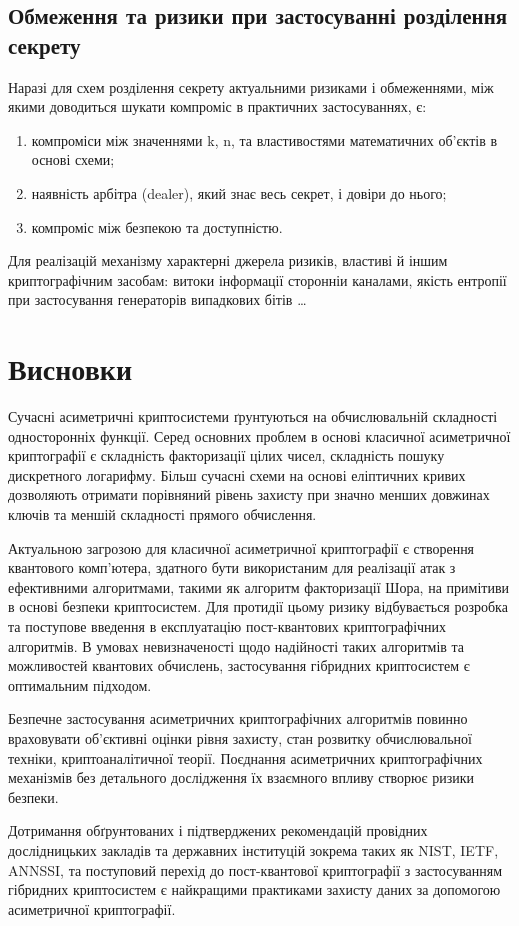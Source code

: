 \documentclass{kpi-lab}
\begin{document}
\section{Обмеження та ризики при застосуванні розділення секрету}

Наразі для схем розділення секрету актуальними ризиками і
обмеженнями, між якими доводиться шукати компроміс в
практичних застосуваннях, є:

\begin{enumerate}
  \item компроміси між значеннями k, n, та властивостями
    математичних об'єктів в основі схеми;
  \item наявність арбітра (dealer), який знає весь секрет,
    і довіри до нього;
  \item компроміс між безпекою та доступністю.
\end{enumerate}

Для реалізацій механізму характерні джерела ризиків, властиві й
іншим криптографічним засобам:
витоки інформації сторонніи каналами,
якість ентропії при застосування генераторів випадкових бітів
\dots

\chapter{Висновки}

Сучасні асиметричні криптосистеми ґрунтуються
на обчислювальній складності односторонніх функції. Серед
основних проблем в основі класичної асиметричної криптографії
є складність факторизації цілих чисел, складність пошуку
дискретного логарифму. Більш сучасні схеми на основі
еліптичних кривих дозволяють отримати порівняний рівень
захисту при значно менших довжинах ключів та меншій
складності прямого обчислення.

Актуальною загрозою для класичної асиметричної криптографії
є створення квантового комп'ютера, здатного бути
використаним для реалізації атак з ефективними алгоритмами,
такими як алгоритм
факторизації Шора, на примітиви в основі безпеки криптосистем.
Для протидії цьому ризику відбувається розробка та
поступове введення в експлуатацію
пост-квантових криптографічних алгоритмів. В умовах
невизначеності щодо надійності таких алгоритмів та
можливостей квантових обчислень, застосування гібридних
криптосистем є оптимальним підходом.

Безпечне застосування асиметричних криптографічних
алгоритмів повинно враховувати об'єктивні оцінки рівня захисту,
стан розвитку обчислювальної техніки, криптоаналітичної теорії.
Поєднання асиметричних криптографічних механізмів без
детального дослідження їх взаємного впливу створює ризики безпеки.

Дотримання обґрунтованих і підтверджених рекомендацій
провідних дослідницьких закладів та державних інституцій
зокрема таких як NIST, IETF, ANNSSI,
та поступовий перехід до пост-квантової криптографії з
застосуванням гібридних криптосистем є найкращими практиками
захисту даних за допомогою асиметричної криптографії.

\printbibliography[
  heading=bibintoc,
  title={Перелік використаних джерел},
]
\end{document}
